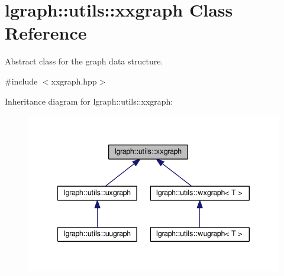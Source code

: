\hypertarget{classlgraph_1_1utils_1_1xxgraph}{}\section{lgraph\+:\+:utils\+:\+:xxgraph Class Reference}
\label{classlgraph_1_1utils_1_1xxgraph}


Abstract class for the graph data structure.  




{\ttfamily \#include $<$xxgraph.\+hpp$>$}



Inheritance diagram for lgraph\+:\+:utils\+:\+:xxgraph\+:
\nopagebreak
\begin{figure}[H]
\begin{center}
\leavevmode
\includegraphics[width=340pt]{classlgraph_1_1utils_1_1xxgraph__inherit__graph}
\end{center}
\end{figure}
